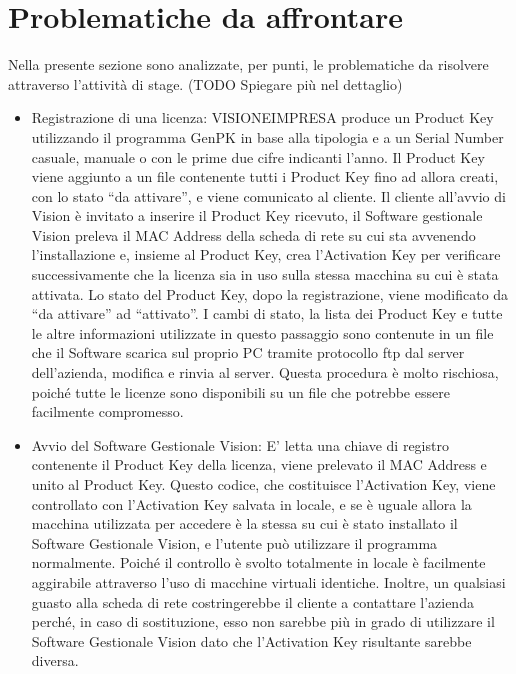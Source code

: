 \section{Problematiche da affrontare}
Nella presente sezione sono analizzate, per punti, le problematiche da risolvere attraverso l'attività di stage. (TODO Spiegare più nel dettaglio)

\begin{itemize}
\item Registrazione di una licenza: VISIONEIMPRESA produce un Product Key utilizzando il programma GenPK in base alla tipologia e a un Serial Number casuale, manuale o con le prime due cifre indicanti l’anno. Il Product Key viene aggiunto a un file contenente tutti i Product Key fino ad allora creati, con lo stato “da attivare”, e viene comunicato al cliente. Il cliente all’avvio di Vision è invitato a inserire il Product Key ricevuto, il Software gestionale Vision preleva il MAC Address della scheda di rete su cui sta avvenendo l’installazione e, insieme al Product Key, crea l’Activation Key per verificare successivamente che la licenza sia in uso sulla stessa macchina su cui è stata attivata. Lo stato del Product Key, dopo la registrazione, viene modificato da “da attivare” ad “attivato”. I cambi di stato, la lista dei Product Key e tutte le altre informazioni utilizzate in questo passaggio sono contenute in un file che il Software scarica sul proprio PC tramite protocollo ftp dal server dell’azienda, modifica e rinvia al server. Questa procedura è molto rischiosa, poiché tutte le licenze sono disponibili su un file che potrebbe essere facilmente compromesso.
\item Avvio del Software Gestionale Vision: E’ letta una chiave di registro contenente il Product Key della licenza, viene prelevato il MAC Address e unito al Product Key. Questo codice, che costituisce l’Activation Key, viene controllato con l’Activation Key salvata in locale, e se è uguale allora la macchina utilizzata per accedere è la stessa su cui è stato installato il Software Gestionale Vision, e l’utente può utilizzare il programma normalmente. Poiché il controllo è svolto totalmente in locale è facilmente aggirabile attraverso l’uso di macchine virtuali identiche. Inoltre, un qualsiasi guasto alla scheda di rete costringerebbe il cliente a contattare l’azienda perché, in caso di sostituzione, esso non sarebbe più in grado di utilizzare il Software Gestionale Vision dato che l’Activation Key risultante sarebbe diversa.

\end{itemize}
